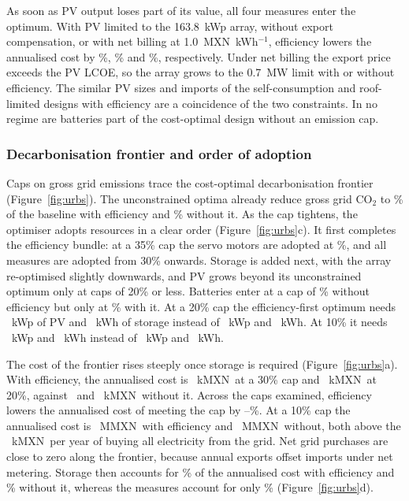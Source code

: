 \documentclass[processes,article,submit,pdftex,moreauthors]{Definitions/mdpi}
\newcommand{\MXN}{MXN}
\begin{document}
As soon as PV output loses part of its value, all four measures enter the optimum. With PV limited to the 163.8~kWp array, without export compensation, or with net billing at 1.0~\MXN~kWh$^{-1}$, efficiency lowers the annualised cost by \nUCostRLSave\%, \nUCostSCSave\% and \nUCostNBSave\%, respectively. Under net billing the export price exceeds the PV LCOE, so the array grows to the 0.7~MW limit with or without efficiency. The similar PV sizes and imports of the self-consumption and roof-limited designs with efficiency are a coincidence of the two constraints. In no regime are batteries part of the cost-optimal design without an emission cap.



\subsubsection{Decarbonisation frontier and order of adoption}
Caps on gross grid emissions trace the cost-optimal decarbonisation frontier (Figure~\ref{fig:urbs}). The unconstrained optima already reduce gross grid CO$_2$ to \nUCOONME\% of the baseline with efficiency and \nUCOONMS\% without it. As the cap tightens, the optimiser adopts resources in a clear order (Figure~\ref{fig:urbs}c). It first completes the efficiency bundle: at a 35\% cap the servo motors are adopted at \nUEtwoAdoptThirtyFive\%, and all measures are adopted from 30\% onwards. Storage is added next, with the array re-optimised slightly downwards, and PV grows beyond its unconstrained optimum only at caps of 20\% or less. Batteries enter at a cap of \nUFirstBatS\% without efficiency but only at \nUFirstBatE\% with it. At a 20\% cap the efficiency-first optimum needs \nUPVTwentyE~kWp of PV and \nUBatTwentyE~kWh of storage instead of \nUPVTwentyS~kWp and \nUBatTwentyS~kWh. At 10\% it needs \nUPVTenE~kWp and \nUBatTenE~kWh instead of \nUPVTenS~kWp and \nUBatTenS~kWh.

The cost of the frontier rises steeply once storage is required (Figure~\ref{fig:urbs}a). With efficiency, the annualised cost is \nUCostThirtyE~k\MXN\ at a 30\% cap and \nUCostTwentyE~k\MXN\ at 20\%, against \nUCostThirtyS\ and \nUCostTwentyS~k\MXN\ without it. Across the caps examined, efficiency lowers the annualised cost of meeting the cap by \nUCapSaveMin--\nUCapSaveMax\%. At a 10\% cap the annualised cost is \nUCostTenE~M\MXN\ with efficiency and \nUCostTenS~M\MXN\ without, both above the \nUGridCost~k\MXN\ per year of buying all electricity from the grid. Net grid purchases are close to zero along the frontier, because annual exports offset imports under net metering. Storage then accounts for \nUBatShareTenE\% of the annualised cost with efficiency and \nUBatShareTenS\% without it, whereas the measures account for only \nUEEShareTenE\% (Figure~\ref{fig:urbs}d).
\end{document}
